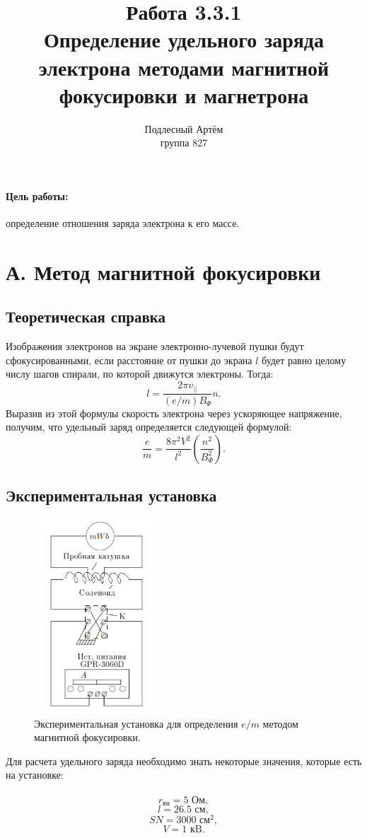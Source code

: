 \documentclass[a4paper, 14pt]{extarticle}%
\author{Подлесный Артём \\ группа 827}
\title{Работа 3.3.1 \\ Определение удельного заряда электрона методами магнитной фокусировки и магнетрона }
\newcommand\ECaption[1]{%
     \captionsetup{font=footnotesize}%
     \caption{#1}}
\begin{document}
\maketitle

\paragraph*{Цель работы:} определение отношения заряда электрона к его массе.

\section*{А. Метод магнитной фокусировки}
\subsection*{Теоретическая справка}
Изображения электронов на экране электронно-лучевой пушки будут сфокусированными, если расстояние от пушки до экрана $l$ будет равно целому числу шагов спирали, по которой движутся электроны. Тогда:
\[l = \dfrac{2\pi v_{||}}{(e/m)B_{\Phi}}n. \]
Выразив из этой формулы скорость электрона через ускоряющее напряжение, получим, что удельный заряд определяется следующей формулой:
\begin{equation}
\frac{e}{m} = \dfrac{8\pi^2V^2}{l^2} \left( \frac{n^2}{B^2_{\Phi}}\right)  .
\end{equation}
\subsection*{Экспериментальная установка}
\begin{figure}[h!]
\begin{center}
\includegraphics[width=0.4\textwidth]{ustA}
\end{center}
\ECaption{Экспериментальная установка для определения $e/m$ методом магнитной фокусировки.}
\end{figure}
Для расчета удельного заряда необходимо знать некоторые значения, которые есть на установке: \\ \\
\[r_{\text{вн}} = 5 \text{ Ом},\]
\[ l = 26.5 \text{ см},\]
\[ SN = 3000 \text{ см}^2,\]
\[ V =1 \text{ кB}.\]
\end{document}

